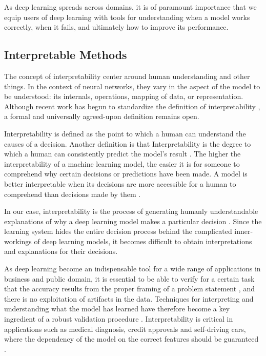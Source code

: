 As deep learning spreads across domains, it is of paramount importance that we equip users of deep learning with tools for understanding when a model works correctly, when it fails, and ultimately how to improve its performance.

\subsection{Interpretable Methods}

The concept of interpretability center around human understanding and other things. In the context of neural networks, they vary in the aspect of the model to be understood: its internals, operations, mapping of data, or representation. Although recent work has begun to standardize the definition of interpretability \cite{Lipton2018}, a formal and universally agreed-upon definition remains open.

Interpretability is defined as the point to which a human can understand the causes of a decision. Another definition is that Interpretability is the degree to which a human can consistently predict the model’s result \cite{molnar}. The higher the interpretability of a machine learning model, the easier it is for someone to comprehend why certain decisions or predictions have been made. A model is better interpretable when its decisions are more accessible for a human to comprehend than decisions made by them \cite{molnar}.
    
In our case, interpretability is the process of generating humanly understandable explanations of why a deep learning model makes a particular decision \cite{Sacha2017}. Since the learning system hides the entire decision process behind the complicated inner-workings of deep learning models, it becomes difficult to obtain interpretations and explanations for their decisions.

As deep learning become an indispensable tool for a wide range of applications in business and public domain, it is essential to be able to verify for a certain task that the accuracy results from the proper framing of a problem statement \cite{Liu2017}, and there is no exploitation of artifacts in the data. Techniques for interpreting and understanding what the model has learned have therefore become a key ingredient of a robust validation procedure \cite{taylor2006methods} \cite{hansen2011visual} \cite{bach2015pixel}. Interpretability is critical in applications such as medical diagnosis, credit approvals and self-driving cars, where the dependency of the model on the correct features should be guaranteed \cite{Caruana:2015:IMH:2783258.2788613} \cite{bojarski2017explaining}.

